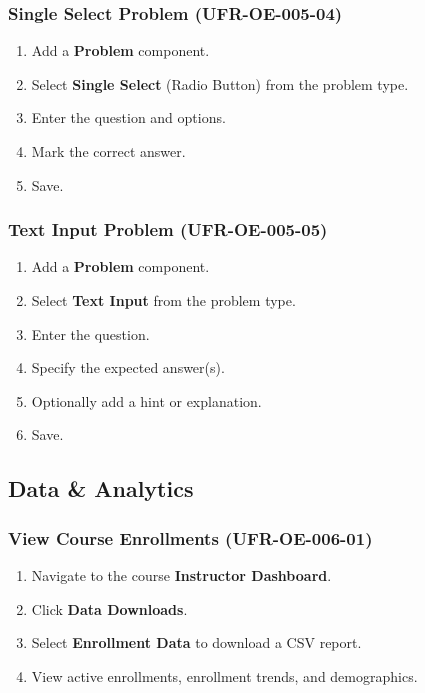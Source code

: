 \subsubsection{Single Select Problem (UFR-OE-005-04)}
\begin{enumerate}
    \item Add a \textbf{Problem} component.
    \item Select \textbf{Single Select} (Radio Button) from the problem type.
    \item Enter the question and options.
    \item Mark the correct answer.
    \item Save.
\end{enumerate}

\subsubsection{Text Input Problem (UFR-OE-005-05)}
\begin{enumerate}
    \item Add a \textbf{Problem} component.
    \item Select \textbf{Text Input} from the problem type.
    \item Enter the question.
    \item Specify the expected answer(s).
    \item Optionally add a hint or explanation.
    \item Save.
\end{enumerate}

\subsection{Data \& Analytics}

\subsubsection{View Course Enrollments (UFR-OE-006-01)}
\begin{enumerate}
    \item Navigate to the course \textbf{Instructor Dashboard}.
    \item Click \textbf{Data Downloads}.
    \item Select \textbf{Enrollment Data} to download a CSV report.
    \item View active enrollments, enrollment trends, and demographics.
\end{enumerate}

